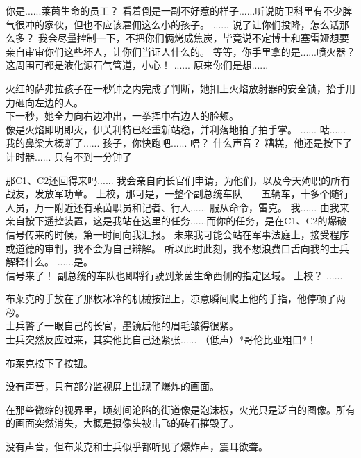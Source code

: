 \documentclass[openany]{book}
\begin{document}
\begin{dialogue}
     你是......莱茵生命的员工？
     看着倒是一副不好惹的样子......听说防卫科里有不少脾气很冲的家伙，但也不应该雇佣这么小的孩子。
     ......
     说了让你们投降，怎么话那么多？
     我会尽量控制一下，不把你们俩烤成焦炭，毕竟说不定博士和塞雷娅想要亲自审审你们这些坏人，让你们当证人什么的。
     等等，你手里拿的是......喷火器？
     这周围可都是液化源石气管道，小心！
     ......
     原来你们是想......\par
    火红的萨弗拉孩子在一秒钟之内完成了判断，她扣上火焰放射器的安全锁，抬手用力砸向左边的人。\\
    下一秒，她全力向右边冲出，一拳挥中右边人的脸颊。\\
    像是火焰即明即灭，伊芙利特已经重新站稳，并利落地拍了拍手掌。
     ......
     咕......
     我的鼻梁大概断了......
     孩子，你快跑吧......
     唔？
     什么声音？
     糟糕，他还是按下了计时器......
     只有不到一分钟了——
\end{dialogue}

\begin{dialogue}
     那C1、C2还回得来吗......
     我会亲自向长官们申请，为他们，以及今天殉职的所有战友，发放军功章。
     上校，那可是，一整个副总统车队——五辆车，十多个随行人员，万一附近还有莱茵职员和记者、行人......
     服从命令，雷克。
     我......
     由我来亲自按下遥控装置，这是我站在这里的任务......而你的任务，是在C1、C2的爆破信号传来的时候，第一时间向我汇报。
     未来我可能会站在军事法庭上，接受程序或道德的审判，我不会为自己辩解。
     所以此时此刻，我不想浪费口舌向我的士兵解释什么。
     ......是。
    \\
     信号来了！
     副总统的车队也即将行驶到莱茵生命西侧的指定区域。
     上校？
     ......\par
    布莱克的手放在了那枚冰冷的机械按钮上，凉意瞬间爬上他的手指，他停顿了两秒。\\
    士兵瞥了一眼自己的长官，墨镜后他的眉毛皱得很紧。\\
    士兵突然反应过来，其实他比自己还紧张......
     （低声）*哥伦比亚粗口*！
\end{dialogue}
\par
布莱克按下了按钮。\par
没有声音，只有部分监视屏上出现了爆炸的画面。\par
在那些微缩的视界里，顷刻间沦陷的街道像是泡沫板，火光只是泛白的图像。所有的画面突然消失，大概是摄像头被击飞的砖石摧毁了。\par
没有声音，但布莱克和士兵似乎都听见了爆炸声，震耳欲聋。
\end{document}
